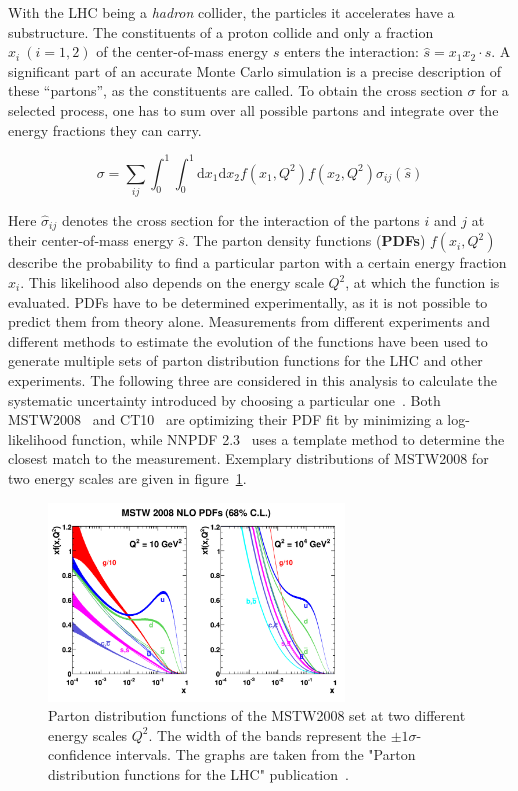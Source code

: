 With the LHC being a \textit{hadron} collider, the particles it accelerates have a substructure. The constituents of a proton collide and only a fraction $x_i \: (i = 1,2)$ of the center-of-mass energy $s$ enters the interaction: $\hat{s} = x_1 x_2 \cdot s$. A significant part of an accurate Monte Carlo simulation is a precise description of these ``partons'', as the constituents are called. To obtain the cross section $\sigma$ for a selected process, one has to sum over all possible partons and integrate over the energy fractions they can carry.

\begin{equation}
  \label{eq:pdfxs}
  \sigma = \sum_{ij} \int_0^1 \int_0^1 \text{d}x_1 \text{d}x_2 f(x_1, Q^2) f(x_2 ,Q^2) \hat{\sigma}_{ij}(\hat{s})
\end{equation}

Here $\hat{\sigma}_{ij}$ denotes the cross section for the interaction of the partons $i$ and $j$ at their center-of-mass energy $\hat{s}$. The parton density functions (\textbf{PDFs}) $f(x_i, Q^2)$ describe the probability to find a particular parton with a certain energy fraction $x_i$. This likelihood also depends on the energy scale $Q^2$, at which the function is evaluated. PDFs have to be determined experimentally, as it is not possible to predict them from theory alone. Measurements from different experiments and different methods to estimate the evolution of the functions have been used to generate multiple sets of parton distribution functions for the LHC and other experiments. The following three are considered in this analysis to calculate the systematic uncertainty introduced by choosing a particular one~\cite{pdfforlhc}. Both \textsc{MSTW2008}~\cite{mstw2008,mstw2008as} and \textsc{CT10}~\cite{ct10} are optimizing their PDF fit by minimizing a log-likelihood function, while \textsc{NNPDF 2.3}~\cite{nnpdf23,nnpdf23as} uses a template method to determine the closest match to the measurement. Exemplary distributions of \textsc{MSTW2008} for two energy scales are given in figure~\ref{fig:mstw2008pdf}.

\begin{figure}[htb!]
  \centering
  \includegraphics[width=0.7\textwidth]{plots/mstw2008pdf.pdf}
  \caption{Parton distribution functions of the MSTW2008 set at two different energy scales $Q^2$. The width of the bands represent the $\pm 1 \sigma$-confidence intervals. The graphs are taken from the "Parton distribution functions for the LHC" publication~\cite{pdfforlhc}.}
  \label{fig:mstw2008pdf}
\end{figure}

